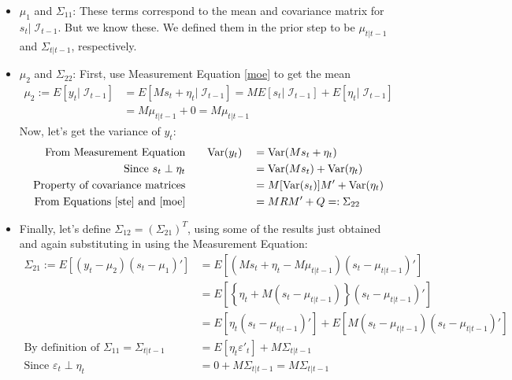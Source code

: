 \documentclass[a4paper,12pt]{article}
\begin{document}
\begin{itemize}
  \item $\mu_1$ and $\Sigma_{11}$: These terms correspond
    to the mean and covariance matrix for $s_t |\;
    \mathcal{I}_{t-1}$. But we know these. We defined them
    in the prior step to be $\mu_{t|t-1}$ and
    $\Sigma_{t|t-1}$, respectively. 

  \item $\mu_2$ and $\Sigma_{22}$: First, use Measurement
    Equation \ref{moe} to get the mean
    \begin{align*}
      \mu_2 := E[y_t | \; \mathcal{I}_{t-1}] &= 
        E[Ms_t + \eta_t | \; \mathcal{I}_{t-1}] =
        ME[s_t|\;\mathcal{I}_{t-1}] 
        + E[\eta_t | \; \mathcal{I}_{t-1}]\\
        &= M \mu_{t|t-1} + 0 = M\mu_{t|t-1}
    \end{align*}
    Now, let's get the variance of $y_t$: 
    \begin{alignat*}{2}
      \text{From Measurement Equation} &\qquad
        \text{Var}(y_t) &&= \text{Var}(Ms_t + \eta_t) \\
      \text{Since $s_t\perp\eta_t$} &\qquad 
        &&= \text{Var}(Ms_t) + \text{Var}(\eta_t)\\
      \text{Property of covariance matrices} &\qquad 
        &&= M [\text{Var}(s_t)] M' + \text{Var}(\eta_t) \\
      \text{From Equations \ref{ste} and \ref{moe}} &\qquad 
        &&= MRM' + Q =: \Sigma_{22}
    \end{alignat*}
    
  \item Finally, let's define $\Sigma_{12} =
    (\Sigma_{21})^T$, using some of the results just
    obtained and again substituting in using the
    Measurement Equation:
    \begin{align*}
      \Sigma_{21} := E\left[(y_t-\mu_2)(s_t - \mu_1)'
        \right] &= 
        E\left[(Ms_t+\eta_t-M\mu_{t|t-1})(s_t-\mu_{t|t-1})'
        \right]  \\
      &= E\left[\left\{\eta_t+ M(s_t-\mu_{t|t-1})\right\}
        (s_t-\mu_{t|t-1})' \right]  \\
      &= E\left[\eta_t(s_t-\mu_{t|t-1})'\right]
        + E\left[M(s_t-\mu_{t|t-1})
        (s_t-\mu_{t|t-1})'\right]  \\
      \text{By definition of $\Sigma_{11}=\Sigma_{t|t-1}$}
      \qquad
      &= E\left[\eta_t\varepsilon'_t\right]
        + M\Sigma_{t|t-1} \\
      \text{Since $\varepsilon_t\perp \eta_t$} \qquad
      &= 0 + M\Sigma_{t|t-1}  = M\Sigma_{t|t-1} 
    \end{align*}
\end{itemize}
\end{document}
